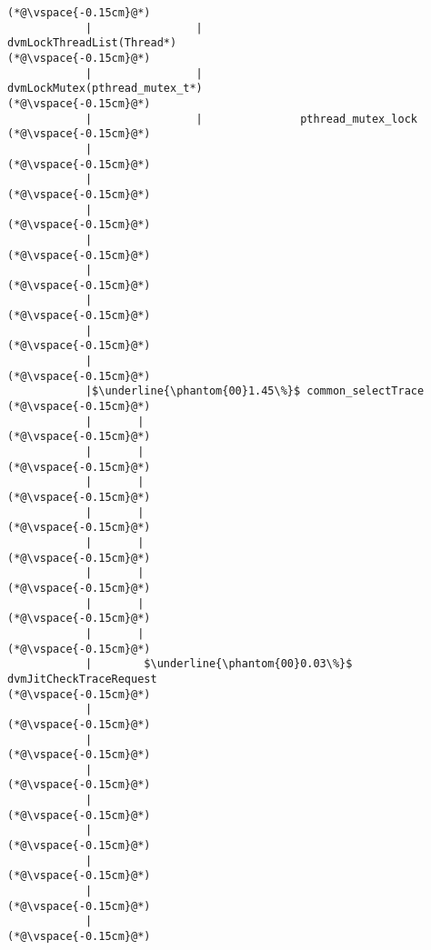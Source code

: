 \begin{lstlisting}[caption=20 viiteparametria Java$\to$C , label=profile:J2CBenchmark00206, numberbychapter=true, frame=lines, float, floatplacement=t]
(*@\vspace{-0.15cm}@*)
            |                |               dvmLockThreadList(Thread*)
(*@\vspace{-0.15cm}@*)
            |                |               dvmLockMutex(pthread_mutex_t*)
(*@\vspace{-0.15cm}@*)
            |                |               pthread_mutex_lock
(*@\vspace{-0.15cm}@*)
            |
(*@\vspace{-0.15cm}@*)
            |
(*@\vspace{-0.15cm}@*)
            |
(*@\vspace{-0.15cm}@*)
            |
(*@\vspace{-0.15cm}@*)
            |
(*@\vspace{-0.15cm}@*)
            |
(*@\vspace{-0.15cm}@*)
            |
(*@\vspace{-0.15cm}@*)
            |
(*@\vspace{-0.15cm}@*)
            |$\underline{\phantom{00}1.45\%}$ common_selectTrace
(*@\vspace{-0.15cm}@*)
            |       |
(*@\vspace{-0.15cm}@*)
            |       |
(*@\vspace{-0.15cm}@*)
            |       |
(*@\vspace{-0.15cm}@*)
            |       |
(*@\vspace{-0.15cm}@*)
            |       |
(*@\vspace{-0.15cm}@*)
            |       |
(*@\vspace{-0.15cm}@*)
            |       |
(*@\vspace{-0.15cm}@*)
            |       |
(*@\vspace{-0.15cm}@*)
            |        $\underline{\phantom{00}0.03\%}$ dvmJitCheckTraceRequest
(*@\vspace{-0.15cm}@*)
            |
(*@\vspace{-0.15cm}@*)
            |
(*@\vspace{-0.15cm}@*)
            |
(*@\vspace{-0.15cm}@*)
            |
(*@\vspace{-0.15cm}@*)
            |
(*@\vspace{-0.15cm}@*)
            |
(*@\vspace{-0.15cm}@*)
            |
(*@\vspace{-0.15cm}@*)
            |
(*@\vspace{-0.15cm}@*)


\end{lstlisting}

